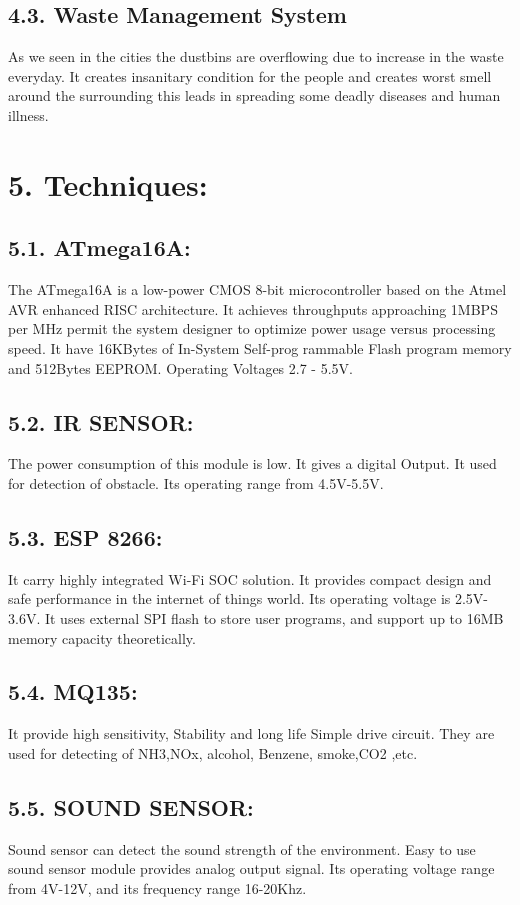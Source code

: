 \documentclass[a4paper]{report}
\begin{document}
	\subsection*{4.3. Waste Management System}
	As we seen in the cities the dustbins are overflowing due to increase in the waste everyday. It creates insanitary
	condition for the people and creates worst smell around the surrounding this leads in spreading some deadly
	diseases and human illness.
	
	\section*{5. Techniques:}
	\subsection*{5.1. ATmega16A:}
	The ATmega16A is a low-power CMOS 8-bit microcontroller based on the Atmel AVR enhanced RISC
	architecture. It achieves throughputs approaching 1MBPS per MHz permit the system designer to optimize
	power usage versus processing speed. It have 16KBytes of In-System Self-prog rammable Flash program
	memory and 512Bytes EEPROM. Operating Voltages 2.7 - 5.5V. 
	\subsection*{5.2. IR SENSOR:} The power consumption of this module is low. It gives a digital Output. It used for detection of obstacle. Its
	operating range from 4.5V-5.5V.
	\subsection*{5.3. ESP 8266:}
	It carry highly integrated Wi-Fi SOC solution. It provides compact design and safe performance in the internet
	of things world. Its operating voltage is 2.5V-3.6V. It uses external SPI flash to store user programs, and support
	up to 16MB memory capacity theoretically.
	\subsection*{5.4. MQ135:}
	It provide high sensitivity, Stability and long life Simple drive circuit. They are used for detecting of NH3,NOx,
	alcohol, Benzene, smoke,CO2 ,etc.
	\subsection*{5.5. SOUND SENSOR:}
	Sound sensor can detect the sound strength of the environment. Easy to use sound sensor module provides
	analog output signal. Its operating voltage range from 4V-12V, and its frequency range 16-20Khz.
\end{document}
